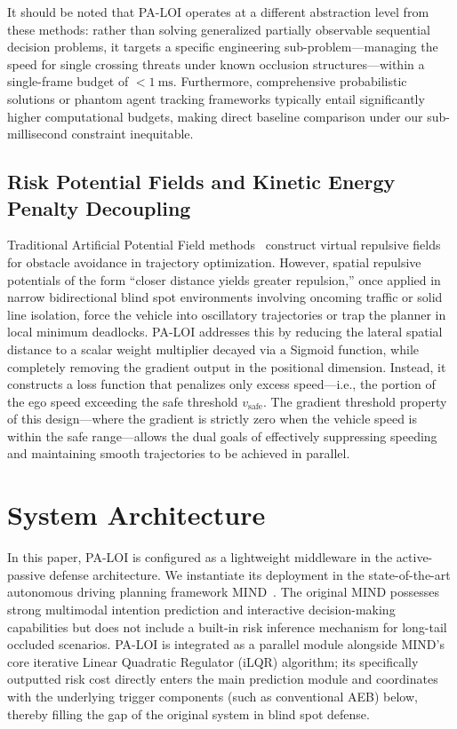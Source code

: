 \documentclass[letterpaper, 10 pt, conference]{ieeeconf}  %
\begin{document}
It should be noted that PA-LOI operates at a different abstraction level from these methods: rather than solving generalized partially observable sequential decision problems, it targets a specific engineering sub-problem---managing the speed for single crossing threats under known occlusion structures---within a single-frame budget of $< \SI{1}{\milli\second}$. Furthermore, comprehensive probabilistic solutions or phantom agent tracking frameworks typically entail significantly higher computational budgets, making direct baseline comparison under our sub-millisecond constraint inequitable.

\subsection{Risk Potential Fields and Kinetic Energy Penalty Decoupling}
Traditional Artificial Potential Field methods~\cite{khatib1986potential} construct virtual repulsive fields for obstacle avoidance in trajectory optimization. However, spatial repulsive potentials of the form ``closer distance yields greater repulsion,'' once applied in narrow bidirectional blind spot environments involving oncoming traffic or solid line isolation, force the vehicle into oscillatory trajectories or trap the planner in local minimum deadlocks. PA-LOI addresses this by reducing the lateral spatial distance to a scalar weight multiplier decayed via a Sigmoid function, while completely removing the gradient output in the positional dimension. Instead, it constructs a loss function that penalizes only excess speed---i.e., the portion of the ego speed exceeding the safe threshold $v_{\text{safe}}$. The gradient threshold property of this design---where the gradient is strictly zero when the vehicle speed is within the safe range---allows the dual goals of effectively suppressing speeding and maintaining smooth trajectories to be achieved in parallel.

\section{System Architecture}

In this paper, PA-LOI is configured as a lightweight middleware in the active-passive defense architecture. We instantiate its deployment in the state-of-the-art autonomous driving planning framework MIND~\cite{mind2025}. The original MIND possesses strong multimodal intention prediction and interactive decision-making capabilities but does not include a built-in risk inference mechanism for long-tail occluded scenarios. PA-LOI is integrated as a parallel module alongside MIND's core iterative Linear Quadratic Regulator (iLQR) algorithm; its specifically outputted risk cost directly enters the main prediction module and coordinates with the underlying trigger components (such as conventional AEB) below, thereby filling the gap of the original system in blind spot defense.
\end{document}
